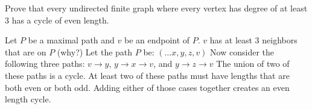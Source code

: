 \question Prove that every undirected finite graph where every vertex 
has degree of at least $3$ has a cycle of even length.

\begin{solution}
Let $P$ be a maximal path and $v$ be an endpoint of $P$.
$v$ has at least 3 neighbors that are on $P$ (why?)
Let the path $P$ be: $(\dotsc x, y, z, v)$
Now consider the following three paths: $v \rightarrow y$, $y 
\rightarrow x \rightarrow v$, and $y \rightarrow z \rightarrow v$
The union of two of these paths is a cycle.
At least two of these paths must have lengths that are both even or 
both odd. Adding either of those cases together creates an even length cycle.
\end{solution}